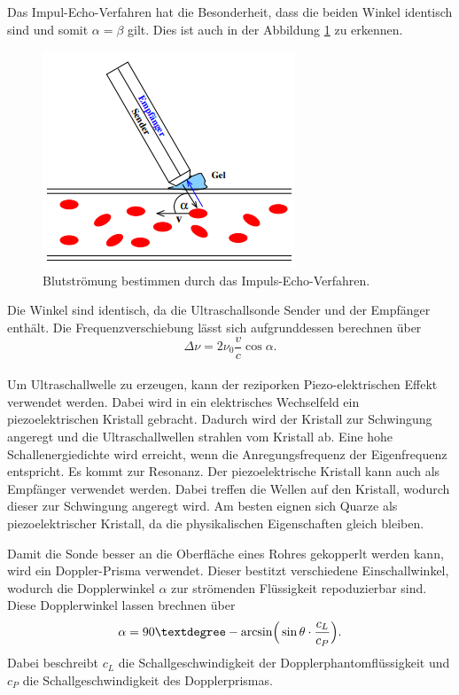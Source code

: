 Das Impul-Echo-Verfahren hat die Besonderheit, dass die beiden Winkel identisch sind und somit $\alpha = \beta$ gilt.
Dies ist auch in der Abbildung \ref{fig:IEV} zu erkennen.
\begin{figure}[H]
    \centering
    \includegraphics[scale=0.5]{content/TheoBild.png}
    \caption{Blutströmung bestimmen durch das Impuls-Echo-Verfahren.}
    \label{fig:IEV}
\end{figure}
Die Winkel sind identisch, da die Ultraschallsonde Sender und der Empfänger enthält.
Die Frequenzverschiebung lässt sich aufgrunddessen berechnen über
\begin{equation}
    \Delta \nu = 2 \nu_0 \frac{v}{c} \cos \alpha.
    \label{eq:deltaf}
\end{equation}
\\

\noindent Um Ultraschallwelle zu erzeugen, kann der reziporken Piezo-elektrischen Effekt verwendet werden.
Dabei wird in ein elektrisches Wechselfeld ein piezoelektrischen Kristall gebracht.
Dadurch wird der Kristall zur Schwingung angeregt und die Ultraschallwellen strahlen vom Kristall ab.
Eine hohe Schallenergiedichte wird erreicht, wenn die Anregungsfrequenz der Eigenfrequenz entspricht.
Es kommt zur Resonanz.
Der piezoelektrische Kristall kann auch als Empfänger verwendet werden.
Dabei treffen die Wellen auf den Kristall, wodurch dieser zur Schwingung angeregt wird.
Am besten eignen sich Quarze als piezoelektrischer Kristall, da die physikalischen Eigenschaften gleich bleiben.

\noindent Damit die Sonde besser an die Oberfläche eines Rohres gekopperlt werden kann, wird ein Doppler-Prisma verwendet.
Dieser bestitzt verschiedene Einschallwinkel, wodurch die Dopplerwinkel $\alpha$ zur strömenden Flüssigkeit repoduzierbar sind.
Diese Dopplerwinkel lassen brechnen über
\begin{equation}
    \alpha = 90° - \arcsin \Bigr( \sin \theta \cdot \frac{c_L}{c_P}\Bigl).
    \label{eq:alp}
\end{equation}
Dabei beschreibt $c_L$ die Schallgeschwindigkeit der Dopplerphantomflüssigkeit und $c_P$ die Schallgeschwindigkeit des Dopplerprismas.

\cite{sample}
